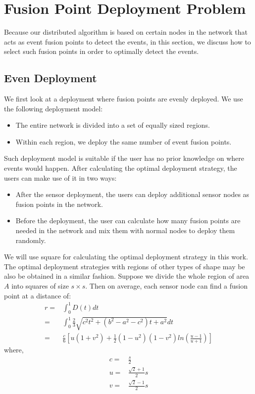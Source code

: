 \section{Fusion Point Deployment Problem}
Because our distributed algorithm is based on certain nodes in the network that acts as event fusion points to detect the events, in this section, we discuss how to select such fusion points in order to optimally detect the events.
\subsection{Even Deployment}
We first look at a deployment where fusion points are evenly deployed. We use the following deployment model:
\begin{itemize}
\item The entire network is divided into a set of equally sized regions.
\item Within each region, we deploy the same number of event fusion points. 
\end{itemize}

Such deployment model is suitable if the user has no prior knowledge on where events would happen. After calculating the optimal deployment strategy, the users can make use of it in two ways:
\begin{itemize}
\item After the sensor deployment, the users can deploy additional sensor nodes as fusion points in the network.
\item Before the deployment, the user can calculate how many fusion points are needed in the network and mix them with normal nodes to deploy them randomly.
\end{itemize}
We will use square for calculating the optimal deployment strategy in this work. The optimal deployment strategies with regions of other types of shape may be also be obtained in a similar fashion. Suppose we divide the whole region of area \(A\) into squares of size \(s\times s\). Then on average, each sensor node can find a fusion point at a distance of:
\begin{align}
r=&\int_0^1D(t)dt\nonumber\\
=&\int_0^1\frac{2}{3}\sqrt{c^2t^2+(b^2-a^2-c^2)t+a^2}dt\nonumber\\
=&\frac{c}{6}[u(1+v^2)+\frac{1}{2}(1-u^2)(1-v^2)ln(\frac{u-1}{u+1})]\label{eq:avgdist1}
\end{align}
where,
\begin{align}
c=&\frac{s}{2}\nonumber\\
u=&\frac{\sqrt{2}+1}{2}s\nonumber\\
v=&\frac{\sqrt{2}-1}{2}s\label{eq:avgdist2}
\end{align}

